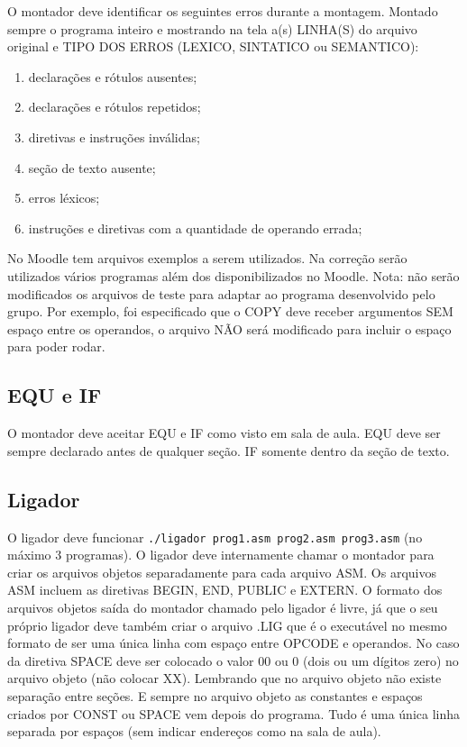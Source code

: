 \documentclass[11pt, a4paper]{article}
\begin{document}
O montador deve identificar os seguintes erros durante a montagem. Montado sempre o programa inteiro e mostrando na tela a(s) LINHA(S) do arquivo original e TIPO DOS ERROS (LEXICO, SINTATICO ou SEMANTICO):
\begin{enumerate}
    \item declarações e rótulos ausentes;
    \item declarações e rótulos repetidos;
    \item diretivas e instruções inválidas;
    \item seção de texto ausente;
    \item erros léxicos;
    \item instruções e diretivas com a quantidade de operando errada;
\end{enumerate}

No Moodle tem arquivos exemplos a serem utilizados. Na correção serão utilizados vários programas além dos disponibilizados no Moodle. Nota: não serão modificados os arquivos de teste para adaptar ao programa desenvolvido pelo grupo. Por exemplo, foi especificado que o COPY deve receber argumentos SEM espaço entre os operandos, o arquivo NÃO será modificado para incluir o espaço para poder rodar.

\subsection{EQU e IF}
O montador deve aceitar EQU e IF como visto em sala de aula. EQU deve ser sempre declarado antes de qualquer seção. IF somente dentro da seção de texto.

\subsection{Ligador}
O ligador deve funcionar \texttt{./ligador prog1.asm prog2.asm prog3.asm} (no máximo 3 programas). O ligador deve internamente chamar o montador para criar os arquivos objetos separadamente para cada arquivo ASM. Os arquivos ASM incluem as diretivas BEGIN, END, PUBLIC e EXTERN. O formato dos arquivos objetos saída do montador chamado pelo ligador é livre, já que o seu próprio ligador deve também criar o arquivo .LIG que é o executável no mesmo formato de ser uma única linha com espaço entre OPCODE e operandos. No caso da diretiva SPACE deve ser colocado o valor 00 ou 0 (dois ou um dígitos zero) no arquivo objeto (não colocar XX). Lembrando que no arquivo objeto não existe separação entre seções. E sempre no arquivo objeto as constantes e espaços criados por CONST ou SPACE vem depois do programa. Tudo é uma única linha separada por espaços (sem indicar endereços como na sala de aula).
\end{document}
